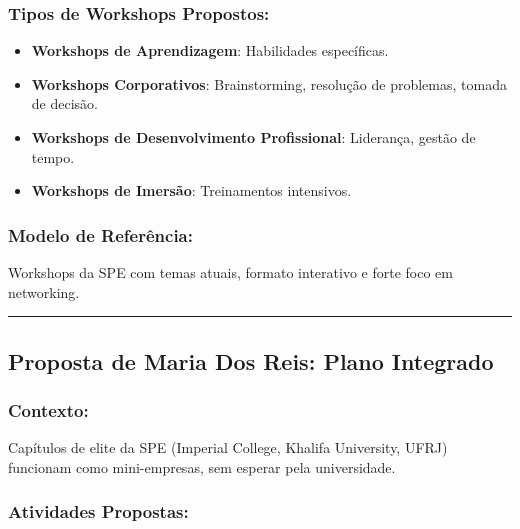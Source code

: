 \documentclass[12pt,a4paper]{article}
\begin{document}
\subsubsection*{Tipos de Workshops Propostos:}

\begin{itemize}[itemsep=0.2cm]
    \item \textbf{Workshops de Aprendizagem}: Habilidades específicas.
    
    \item \textbf{Workshops Corporativos}: Brainstorming, resolução de problemas, tomada de decisão.
    
    \item \textbf{Workshops de Desenvolvimento Profissional}: Liderança, gestão de tempo.
    
    \item \textbf{Workshops de Imersão}: Treinamentos intensivos.
\end{itemize}

\subsubsection*{Modelo de Referência:}
Workshops da SPE com temas atuais, formato interativo e forte foco em networking.

\textcolor{spe-secondary}{\hspace{0.5cm}\rule{0.4\linewidth}{0.8pt}}
\subsection{Proposta de Maria Dos Reis: Plano Integrado}

\subsubsection*{Contexto:}
Capítulos de elite da SPE (Imperial College, Khalifa University, UFRJ) funcionam como mini-empresas, sem esperar pela universidade.

\subsubsection*{Atividades Propostas:}
\end{document}
